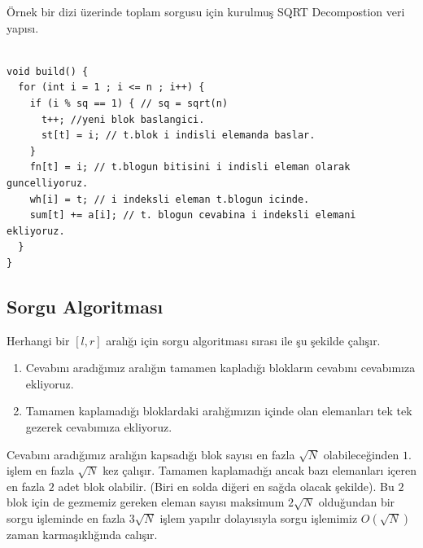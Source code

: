 \documentclass[12pt]{article}
\begin{document}
	\"{O}rnek bir dizi \"{u}zerinde toplam sorgusu i\c{c}in kurulmu\c{s} SQRT Decompostion veri yap{\i}s{\i}.
	
    \begin{verbatim}

void build() {
  for (int i = 1 ; i <= n ; i++) {
    if (i % sq == 1) { // sq = sqrt(n)
      t++; //yeni blok baslangici.
      st[t] = i; // t.blok i indisli elemanda baslar.
    }
    fn[t] = i; // t.blogun bitisini i indisli eleman olarak guncelliyoruz.
    wh[i] = t; // i indeksli eleman t.blogun icinde.
    sum[t] += a[i]; // t. blogun cevabina i indeksli elemani ekliyoruz.
  }
}

    \end{verbatim}
    
    \newpage

	\subsection{Sorgu Algoritmas{\i}}
	
	Herhangi bir $[l,r]$ aral{\i}\u{g}{\i} i\c{c}in sorgu algoritmas{\i} s{\i}ras{\i} ile \c{s}u \c{s}ekilde \c{c}al{\i}\c{s}{\i}r.
	
	\begin{enumerate}
	    \item Cevab{\i}n{\i} arad{\i}\u{g}{\i}m{\i}z aral{\i}\u{g}{\i}n tamamen kaplad{\i}\u{g}{\i} bloklar{\i}n cevab{\i}n{\i} cevab{\i}m{\i}za ekliyoruz.
	    
	    \item Tamamen kaplamad{\i}\u{g}{\i} bloklardaki aral{\i}\u{g}{\i}m{\i}z{\i}n i\c{c}inde olan elemanlar{\i} tek tek gezerek cevab{\i}m{\i}za ekliyoruz.
	    
	\end{enumerate}
	
     Cevab{\i}n{\i} arad{\i}\u{g}{\i}m{\i}z aral{\i}\u{g}{\i}n kapsad{\i}\u{g}{\i} blok say{\i}s{\i} en fazla $\sqrt{N}$ olabilece\u{g}inden $1.$ i\c{s}lem en fazla $\sqrt{N}$ kez \c{c}al{\i}\c{s}{\i}r. Tamamen kaplamad{\i}\u{g}{\i} ancak baz{\i} elemanlar{\i} i\c{c}eren en fazla $2$ adet blok olabilir. (Biri en solda di\u{g}eri en sa\u{g}da olacak \c{s}ekilde). Bu $2$ blok i\c{c}in de gezmemiz gereken eleman say{\i}s{\i} maksimum $2\sqrt{N}$ oldu\u{g}undan bir sorgu i\c{s}leminde en fazla $3\sqrt{N}$ i\c{s}lem yap{\i}l{\i}r dolay{\i}s{\i}yla sorgu i\c{s}lemimiz $O({\sqrt{N}})$ zaman karma\c{s}{\i}kl{\i}\u{g}{\i}nda cal{\i}\c{s}{\i}r.
    
\end{document}
